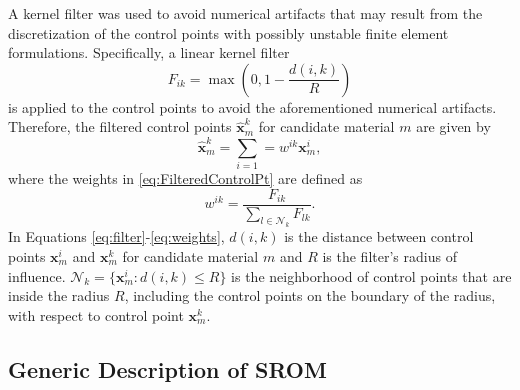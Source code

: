 A kernel filter was used to avoid numerical artifacts that may result from the discretization of the control points with possibly unstable finite element formulations. Specifically, a linear kernel filter \cite{bourdin2001filters,bruns2001topology}
\begin{equation}
\label{eq:filter}
F_{ik}=\max\left(0,1-\frac{d(i,k)}{R}\right)
\end{equation}
is applied to the control points to avoid the aforementioned numerical artifacts. Therefore, the filtered control points $\hat{\bm{x}}^k_m$ for candidate material $m$ are given by 
\begin{equation}
\label{eq:FilteredControlPt}
\hat{\bm{x}}_m^k=\sum_{i=1}=w^{ik}\bm{x}_m^i, 
\end{equation}
where the weights in \eqref{eq:FilteredControlPt} are defined as 
\begin{equation}
\label{eq:weights}
w^{ik}=\frac{F_{ik}}{\sum_{l\in\mathcal{N}_k}F_{lk}}.
\end{equation}
In Equations \eqref{eq:filter}-\eqref{eq:weights}, $d(i,k)$ is the distance between control points $\bm{x}_m^i$ and $\bm{x}_m^k$ for candidate material $m$ and $R$ is the filter's radius of influence. $\mathcal{N}_{k}=\{\bm{x}_m^i\colon d(i,k)\leq{R}\}$ is the neighborhood of control points that are inside the radius $R$, including the control points on the boundary of the radius, with respect to control point $\bm{x}_m^k$. 

\subsection{Generic Description of SROM}

